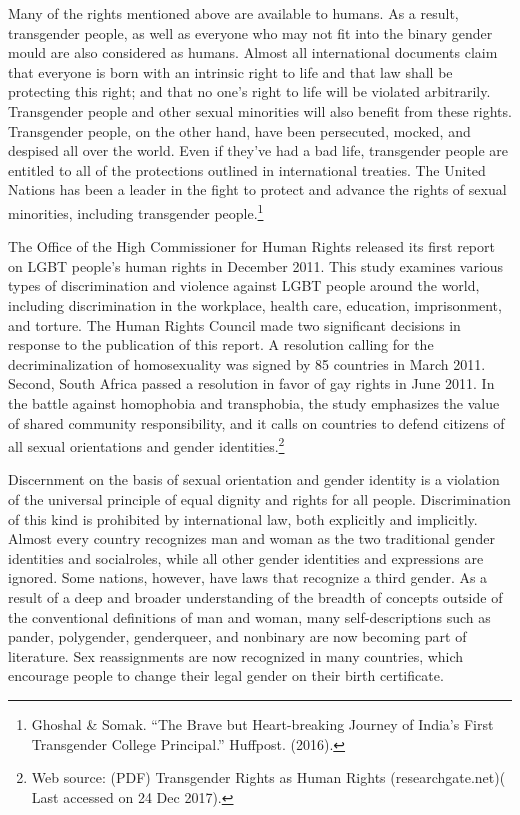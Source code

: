 \begin{multicols}{2}
\vspace{-.15cm}


\vspace{-.15cm}

\noi
Many of the rights mentioned above are available to humans. As a result, transgender people,
as well as everyone who may not fit into the binary gender mould are also considered as
humans. Almost all international documents claim that everyone is born with an intrinsic right
to life and that law shall be protecting this right; and that no one's right to life will be violated
arbitrarily. Transgender people and other sexual minorities will also benefit from these rights.
Transgender people, on the other hand, have been persecuted, mocked, and despised all over
the world. Even if they've had a bad life, transgender people are entitled to all of the protections
outlined in international treaties. The United Nations has been a leader in the fight to protect
and advance the rights of sexual minorities, including transgender people.\footnote{Ghoshal \& Somak. “The Brave but Heart-breaking Journey of India’s First Transgender College Principal.” Huffpost. (2016).}

\noi
The Office of the High Commissioner for Human Rights released its first report on LGBT
people's human rights in December 2011. This study examines various types of discrimination
and violence against LGBT people around the world, including discrimination in the
workplace, health care, education, imprisonment, and torture. The Human Rights Council made
two significant decisions in response to the publication of this report. A resolution calling for
the decriminalization of homosexuality was signed by 85 countries in March 2011. Second,
South Africa passed a resolution in favor of gay rights in June 2011. In the battle against
homophobia and transphobia, the study emphasizes the value of shared community
responsibility, and it calls on countries to defend citizens of all sexual orientations and gender
identities.\footnote{Web source: (PDF) Transgender Rights as Human Rights (researchgate.net)( Last accessed on 24 Dec 2017).}

\noi
Discernment on the basis of sexual orientation and gender identity is a violation of the universal
principle of equal dignity and rights for all people. Discrimination of this kind is prohibited by
international law, both explicitly and implicitly. Almost every country recognizes man and
woman as the two traditional gender identities and socialroles, while all other gender identities
and expressions are ignored. Some nations, however, have laws that recognize a third gender.
As a result of a deep and broader understanding of the breadth of concepts outside of the
conventional definitions of man and woman, many self-descriptions such as pander,
polygender, genderqueer, and nonbinary are now becoming part of literature. Sex
reassignments are now recognized in many countries, which encourage people to change their
legal gender on their birth certificate.


\end{multicols}
